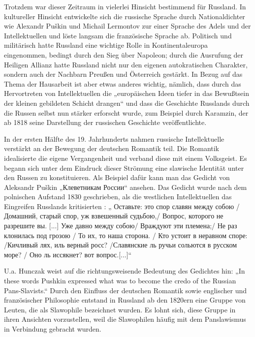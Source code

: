 \documentclass[12pt,headsepline,a4paper]{scrartcl}
\newcommand\textcyr[1]{{\fontencoding{OT2}\fontfamily{wncyr}\selectfont #1}}
\begin{document}
Trotzdem war dieser Zeitraum in vielerlei Hinsicht bestimmend für Russland. In kultureller
Hinsicht entwickelte sich die russische Sprache durch Nationaldichter wie Alexandr Puškin
und Michail Lermontov zur einer Sprache des Adels und der Intellektuellen und löste langsam
die französische Sprache ab. Politisch und militärisch hatte Russland eine wichtige Rolle in
Kontinentaleuropa eingenommen, bedingt durch den Sieg über Napoleon; durch die
Ausrufung der Heiligen Allianz hatte Russland nicht nur den eigenen autokratischen
Charakter, sondern auch der Nachbarn Preußen und Österreich gestärkt. In Bezug auf das
Thema der Hausarbeit ist aber etwas anderes wichtig, nämlich, dass durch das Hervortreten
von Intellektuellen die „europäischen Ideen tiefer in das Bewußtsein der kleinen gebildeten
Schicht drangen“\autocite[117]{kohn} und dass die Geschichte Russlands durch die Russen
selbst nun stärker erforscht wurde, zum Beispiel durch Karamzin, der ab 1818 seine
Darstellung der russischen Geschichte veröffentlichte.

In der ersten Hälfte des 19. Jahrhunderts nahmen russische Intellektuelle verstärkt an der
Bewegung der deutschen Romantik teil. Die Romantik idealisierte die eigene Vergangenheit
und verband diese mit einem Volksgeist. Es begann sich unter dem Eindruck dieser Strömung
eine slawische Identität unter den Russen zu konstituieren. Als Beispiel dafür kann man das
Gedicht von Aleksandr Puškin „\textcyr{Клеветникам России}“ ansehen. Das Gedicht wurde nach
dem polnischen Aufstand 1830 geschrieben, als die westlichen Intellektuellen das Eingreifen
Russlands kritisierten :
„\textcyr{
Оставьте: это спор славян между собою / Домашний, старый спор, уж взвешенный
судьбою,/ Вопрос, которого не разрешите вы. [...] Уже давно между собою/ Враждуют
эти племена;/ Не раз клонилась под грозою / То их, то наша сторона. / Кто устоит в
неравном споре: /Кичливый лях, иль верный росс? /Славянские ль ручьи сольются в
русском море? / Оно ль иссякнет? вот вопрос.[...]}“\autocite[282]{pushkin}

U.a. Hunczak\autocite[89]{hunczak} weist auf die richtungsweisende Bedeutung des Gedichtes hin: „In
these words Pushkin expressed what was to become the credo of the Russian Pans-Slavists.“
Durch den Einfluss der deutschen Romantik sowie englischer und französischer Philosophie
entstand in Russland ab den 1820ern eine Gruppe von Leuten, die als Slawophile bezeichnet
wurden. Es lohnt sich, diese Gruppe in ihren Ansichten vorzustellen, weil die Slawophilen
häufig mit dem Panslawismus in Verbindung gebracht wurden.
\end{document}
